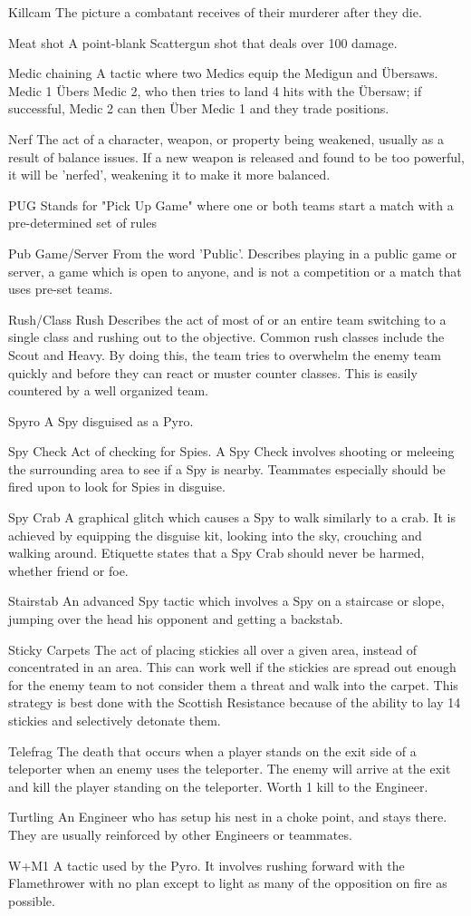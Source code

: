 Killcam The picture a combatant receives of their murderer after they die.
 
Meat shot A point-blank Scattergun shot that deals over 100 damage.

Medic chaining A tactic where two Medics equip the Medigun and Übersaws. Medic 1 Übers Medic 2, who then tries to land 4 hits with the Übersaw; if successful, Medic 2 can then Über Medic 1 and they trade positions.

Nerf The act of a character, weapon, or property being weakened, usually as a result of balance issues. If a new weapon is released and found to be too powerful, it will be 'nerfed', weakening it to make it more balanced.

PUG Stands for "Pick Up Game" where one or both teams start a match with a pre-determined set of rules

Pub Game/Server From the word 'Public'. Describes playing in a public game or server, a game which is open to anyone, and is not a competition or a match that uses pre-set teams.

Rush/Class Rush Describes the act of most of or an entire team switching to a single class and rushing out to the objective. Common rush classes include the Scout and Heavy. By doing this, the team tries to overwhelm the enemy team quickly and before they can react or muster counter classes. This is easily countered by a well organized team.

Spyro A Spy disguised as a Pyro.

Spy Check Act of checking for Spies. A Spy Check involves shooting or meleeing the surrounding area to see if a Spy is nearby.  Teammates especially should be fired upon to look for Spies in disguise.

Spy Crab A graphical glitch which causes a Spy to walk similarly to a crab. It is achieved by equipping the disguise kit, looking into the sky, crouching and walking around. Etiquette states that a Spy Crab should never be harmed, whether friend or foe.

Stairstab An advanced Spy tactic which involves a Spy on a staircase or slope, jumping over the head his opponent and getting a backstab.

Sticky Carpets The act of placing stickies all over a given area, instead of concentrated in an area. This can work well if the stickies are spread out enough for the enemy team to not consider them a threat and walk into the carpet. This strategy is best done with the Scottish Resistance because of the ability to lay 14 stickies and selectively detonate them.

Telefrag The death that occurs when a player stands on the exit side of a teleporter when an enemy uses the teleporter. The enemy will arrive at the exit and kill the player standing on the teleporter. Worth 1 kill to the Engineer. 

Turtling An Engineer who has setup his nest in a choke point, and stays there. They are usually reinforced by other Engineers or teammates.

W+M1 A tactic used by the Pyro. It involves rushing forward with the Flamethrower with no plan except to light as many of the opposition on fire as possible.